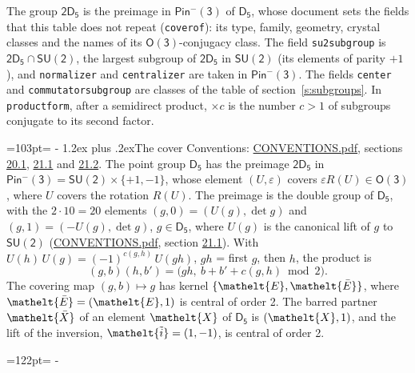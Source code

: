 \documentclass[10pt,a4paper]{article}
\makeatletter
\renewcommand\section{\@startsection{section}{1}{\z@}{-3ex plus -1ex minus -.2ex}%
  {1.2ex plus .2ex}{\normalfont\large\sffamily\bfseries\color{parttitle}}}
\newcommand{\needspace}[1]{\par\penalty-100\begingroup\dimen0=#1\relax\dimen2=\pagegoal
  \advance\dimen2-\pagetotal\ifdim\dimen0>\dimen2\relax\ifdim\dimen2>0pt\vfil\break\fi\fi
  \endgroup}
\numberwithin{equation}{section}
\newcommand{\eltfont}[1]{{\let\sigma\eltsigma\mathelt{#1}}}
\newcommand{\grp}[1]{\mathsf{#1}}
\newcommand{\elt}[1]{\eltfont{#1}}
\newcommand{\dirprod}{\times}
\newcommand{\barred}[1]{\bar{#1}}
\newcommand{\lift}[1]{\tilde{#1}}
\makeatother
\begin{document}
\leavevmode\label{n:element.inversion}\label{n:group.preimage}The group $\grp{2D_{5}}$ is the preimage in $\grp{Pin^{-}(3)}$ of \href{../../../rotation/data/pdf/D5.pdf}{$\grp{D_{5}}$}, whose document sets the fields that this table does not repeat (\texttt{coverof}): its type, family, geometry, crystal classes and the names of its \href{../../../rotation/data/pdf/O3.pdf}{$\grp{O(3)}$}-conjugacy class. The field \texttt{su2subgroup} is $\grp{2D_{5}} \cap \grp{SU(2)}$, the largest subgroup of $\grp{2D_{5}}$ in $\grp{SU(2)}$ (its elements of parity $+1$), and \texttt{normalizer} and \texttt{centralizer} are taken in $\grp{Pin^{-}(3)}$. The fields \texttt{center} and \texttt{commutatorsubgroup} are classes of the table of section~\ref{s:subgroups}.
\leavevmode\label{n:index.conjugates.c}In \texttt{productform}, after a semidirect product, ${\times}c$ is the number $c > 1$ of subgroups conjugate to its second factor.
\needspace{103pt}
\section{The cover}\label{s:cover}
Conventions: \href{../../CONVENTIONS.pdf}{CONVENTIONS.pdf}, sections \href{../../CONVENTIONS.pdf\#conv.20.1}{20.1}, \href{../../CONVENTIONS.pdf\#conv.21.1}{21.1} and \href{../../CONVENTIONS.pdf\#conv.21.2}{21.2}.
\leavevmode\label{n:group.pin.minus}\label{n:group.su2}\label{n:local.pin.sign}\label{n:matrix.covered}\label{n:matrix.lift.su2}\label{n:index.bar}The point group $\grp{D_{5}}$ has the preimage $\grp{2D_{5}}$ in $\grp{Pin^{-}(3)} = \grp{SU(2)} \dirprod \{+1, -1\}$, whose element $(U, \varepsilon)$ covers $\varepsilon R(U) \in \grp{O(3)}$, where $U$ covers the rotation $R(U)$. The preimage is the double group of $\grp{D_{5}}$, with the $2 \cdot 10 = 20$ elements $(g, 0) = (U(g), \det g)$ and $(g, 1) = (-U(g), \det g)$, $g \in \grp{D_{5}}$, where $U(g)$ is the canonical lift of $g$ to $\grp{SU(2)}$ (\href{../../CONVENTIONS.pdf}{CONVENTIONS.pdf}, section \href{../../CONVENTIONS.pdf\#conv.21.1}{21.1}). \label{n:function.cocycle}With $U(h)\,U(g) = (-1)^{c(g,h)}\,U(gh)$, $gh$ = first $g$, then $h$, the product is
\begin{equation}\label{e:product}(g, b)(h, b') = \bigl(gh,\ b + b' + c(g, h) \bmod 2\bigr).\end{equation}
\leavevmode\label{n:mark.bar}The covering map $(g, b) \mapsto g$ has kernel $\{\elt{E}, \elt{\barred{E}}\}$, where $\elt{\barred{E}} = (\elt{E}, 1)$ is central of order 2. \label{n:element.named}\label{n:mark.lift}The barred partner $\elt{\barred{X}}$ of an element $\elt{X}$ of $\grp{D_{5}}$ is $(\elt{X}, 1)$, and the lift of the inversion, $\elt{\lift{i}} = (1, -1)$, is central of order 2.
\needspace{122pt}
\end{document}
